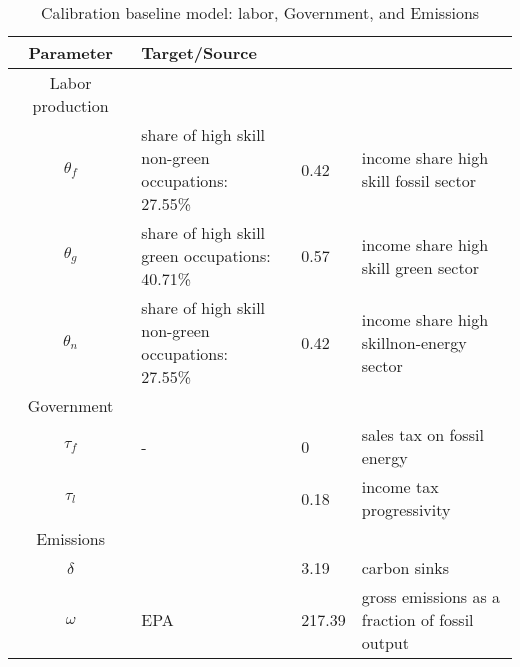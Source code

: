  \begin{table}[hh!!!!!]
 	\begin{center}
 		\captionsetup{width=0.9\textwidth}
 		\caption{ Calibration baseline model: labor, Government, and Emissions}
 		\label{tab:calib2}
 		\begin{tabular}{c|lll}
 			\hline \hline
 			Parameter& Target/Source& \makecell[l]{Calibration}& \makecell[l]{Meaning}\\ 
 			\hline
 			\hline
 			Labor production&\multicolumn{3}{c}{}\\
 			\hline 
 			
 			\hline
 			$\theta_f$&\makecell[l]{share of high skill\\ non-green occupations: \\27.55\% }&0.42&\makecell[l]{income share high \\ skill fossil sector}\\
 			\hline
 			$\theta_g$&\makecell[l]{share of high skill\\ green occupations: \\40.71\% }&0.57&\makecell[l]{income share high \\skill green sector}\\
 			\hline
 			$\theta_n$&\makecell[l]{share of high skill\\ non-green occupations: \\27.55\% }&0.42&\makecell[l]{income share high \\ skillnon-energy sector}\\
 			\hline
 			\hline
 			Government&\multicolumn{3}{c}{}\\
 			\hline
 			
 			\hline
 			$\tau_f$&- &0& sales tax on fossil energy\\
 			\hline
 			$\tau_l$&\cite{Heathcote2017OptimalFramework} &0.18& income tax progressivity\\
 			\hline	
 			\hline
 			Emissions&\multicolumn{3}{c}{}\\
 			\hline
 			
 			\hline
 			$\delta$& \makecell[l]{EPA}&3.19&carbon sinks \\
 			\hline
 			$\omega$& EPA&217.39& \makecell[l]{ gross emissions as a\\ fraction of fossil output}\\
 			\hline \hline
 		\end{tabular}
 	\end{center}
 \end{table}
